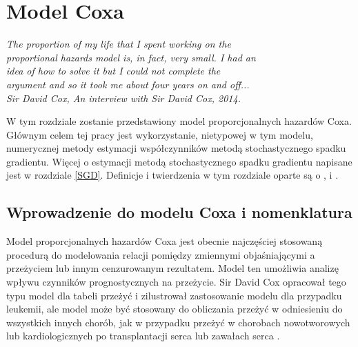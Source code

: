 \chapter{Model Coxa}
\begin{flushright}
\textit{The proportion of my life that I spent working on the \\ 
proportional hazards model is, in fact, very small. I had an \\
 idea of how to solve it but I could not complete the \\
  argument and so it took me about four years on and off... \\
Sir David Cox, An interview with Sir David Cox, 2014.
}
\end{flushright}


W tym rozdziale zostanie przedstawiony model proporcjonalnych hazardów Coxa. Głównym celem tej pracy jest wykorzystanie, nietypowej w tym modelu, numerycznej metody estymacji współczynników metodą stochastycznego spadku gradientu. Więcej o estymacji metodą stochastycznego spadku gradientu napisane jest w rozdziale \ref{SGD}. Definicje i twierdzenia w tym rozdziale oparte są o \cite{cox}, \cite{ther} i \cite{assel}.



\section{Wprowadzenie do modelu Coxa i nomenklatura}

Model proporcjonalnych hazardów Coxa \cite{cox} jest obecnie najczęściej stosowaną procedurą do modelowania relacji pomiędzy zmiennymi objaśniającymi a przeżyciem lub innym cenzurowanym rezultatem. Model ten umożliwia analizę wpływu czynników prognostycznych na przeżycie. Sir David Cox opracował tego typu model dla tabeli przeżyć i zilustrował zastosowanie modelu dla przypadku
leukemii, ale model może być stosowany do obliczania
przeżyć w odniesieniu do wszystkich innych chorób, jak
w przypadku przeżyć w chorobach nowotworowych lub
kardiologicznych po transplantacji serca lub zawałach
serca \cite{norwe}. 

